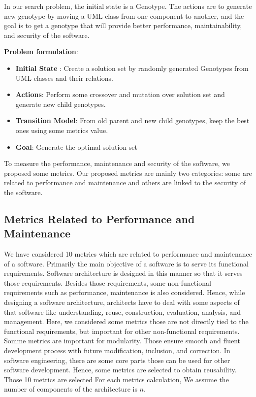 \documentclass[letterpaper, 10 pt, conference]{ieeeconf}  %
\begin{document}


In our search problem, the initial state is a Genotype. The actions are to generate new genotype by moving a UML class from one component to another, and the goal is to get a genotype that will provide better performance, maintainability, and security of the software.

\textbf{Problem formulation}:
\begin{itemize}
\item \textbf{Initial State} : Create a solution set by randomly generated Genotypes from UML classes and their relations.

\item\textbf{Actions}: Perform some crossover and mutation over  
solution set and generate new child genotypes.
\item \textbf{Transition Model}: From old parent and new child genotypes, keep the best ones using some metrics value.
\item \textbf{Goal}: Generate the optimal solution set

\end{itemize}


To measure the performance, maintenance and security of the software, we proposed some metrics. Our proposed metrics are mainly two categories: some are related to performance and maintenance and others are linked to the security of the software.


\subsection{Metrics Related to Performance and Maintenance}
We have considered  10 metrics which are related to performance and maintenance of a software. Primarily the main objective of a software is to serve its functional requirements. Software architecture is designed in this manner so that it serves those requirements. Besides those requirements, some non-functional requirements such as performance, maintenance is also considered. Hence, while designing a software architecture, architects have to deal with some aspects of that software like understanding, reuse, construction, evaluation, analysis, and management\cite{garlan2000software}. Here, we considered some metrics those are not directly tied to the functional requirements, but important for other non-functional requirements. Somme metrics are important for modularity. Those ensure smooth and fluent development process with future modification, inclusion, and correction. 
In software engineering, there are some core parts those can be used for other software development. Hence, some metrics are selected to obtain reusability.
Those 10 metrics are selected
 \newline
For each metrics calculation,  We assume the number of components of the architecture is $n$. 
\end{document}

